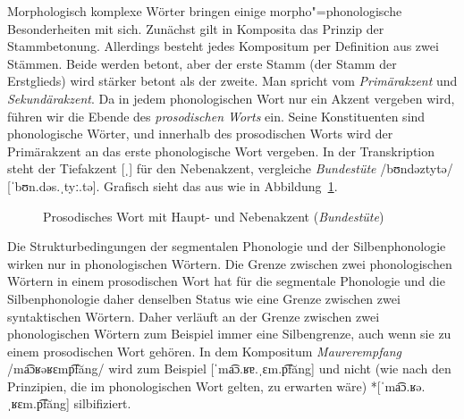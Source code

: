 Morphologisch komplexe Wörter bringen einige morpho"=phonologische Besonderheiten mit sich.
Zunächst gilt in Komposita das Prinzip der Stammbetonung.
Allerdings besteht jedes Kompositum per Definition aus zwei Stämmen.
Beide werden betont, aber der erste Stamm (der Stamm der Erstglieds) wird stärker betont als der zweite.
Man spricht vom \textit{Primärakzent} und \textit{Sekundärakzent}.
Da in jedem phonologischen Wort nur ein Akzent vergeben wird, führen wir die Ebende des \textit{prosodischen Worts} ein.
Seine Konstituenten sind phonologische Wörter, und innerhalb des prosodischen Worts wird der Primärakzent an das erste phonologische Wort vergeben.
In der Transkription steht der Tiefakzent [ˌ] für den Nebenakzent, vergleiche \textit{Bundestüte} /bʊndəztytə/ [ˈbʊn.dəs.ˌtyː.tə].
Grafisch sieht das aus wie in Abbildung~\ref{fig:prosodischeswort}.

\begin{figure}[!htpb]
  \centering
  \caption{Prosodisches Wort mit Haupt- und Nebenakzent (\textit{Bundestüte})}
  \label{fig:prosodischeswort}
\end{figure}

Die Strukturbedingungen der segmentalen Phonologie und der Silbenphonologie wirken nur in phonologischen Wörtern.
Die Grenze zwischen zwei phonologischen Wörtern in einem prosodischen Wort hat für die segmentale Phonologie und die Silbenphonologie daher denselben Status wie eine Grenze zwischen zwei syntaktischen Wörtern.
Daher verläuft an der Grenze zwischen zwei phonologischen Wörtern zum Beispiel immer eine Silbengrenze, auch wenn sie zu einem prosodischen Wort gehören.
In dem Kompositum \textit{Maurerempfang} /ma͡ɔʁəʁɛmp͡făng/ wird zum Beispiel [ˈma͡ɔ.ʁɐ.ˌɛm.p͡făng] und nicht (wie nach den Prinzipien, die im phonologischen Wort gelten, zu erwarten wäre) *[ˈma͡ɔ.ʁə.ˌʁɛm.p͡făng] silbifiziert.

